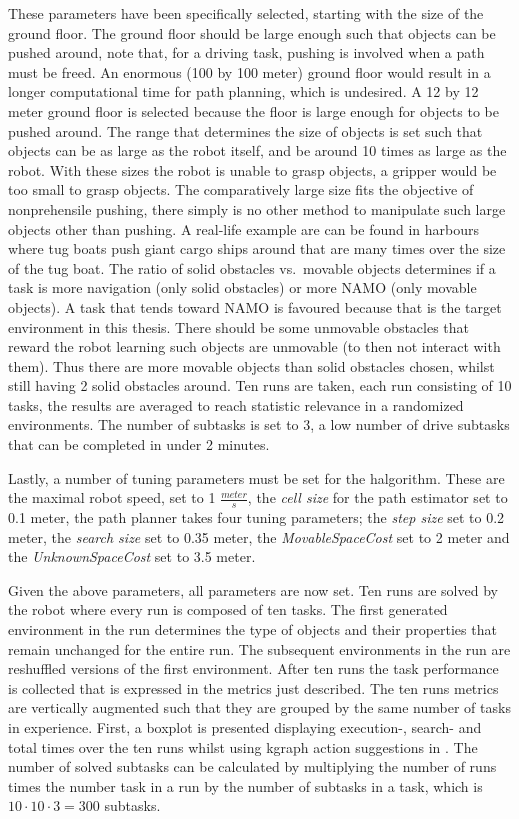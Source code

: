 These parameters have been specifically selected, starting with the size of the ground floor. The ground floor should be large enough such that objects can be pushed around, note that, for a driving task, pushing is involved when a path must be freed. An enormous (100 by 100 meter) ground floor would result in a longer computational time for path planning, which is undesired. A 12 by 12 meter ground floor is selected because the floor is large enough for objects to be pushed around. The range that determines the size of objects is set such that objects can be as large as the robot itself, and be around 10 times as large as the robot. With these sizes the robot is unable to grasp objects, a gripper would be too small to grasp objects. The comparatively large size fits the objective of nonprehensile pushing, there simply is no other method to manipulate such large objects other than pushing. A real-life example are can be found in harbours where tug boats push giant cargo ships around that are many times over the size of the tug boat. The ratio of solid obstacles vs.~movable objects determines if a task is more navigation (only solid obstacles) or more \ac{NAMO} (only movable objects). A task that tends toward \ac{NAMO} is favoured because that is the target environment in this thesis. There should be some unmovable obstacles that reward the robot learning such objects are unmovable (to then not interact with them). Thus there are more movable objects than solid obstacles chosen, whilst still having 2 solid obstacles around. Ten runs are taken, each run consisting of 10 tasks, the results are averaged to reach statistic relevance in a randomized environments. The number of subtasks is set to 3, a low number of drive subtasks that can be completed in under 2 minutes.\bs

Lastly, a number of tuning parameters must be set for the \ac{halgorithm}. These are the maximal robot speed, set to 1 $\frac{\mathit{meter}}{\mathit{s}}$, the \textit{cell size} for the path estimator set to 0.1 meter, the path planner takes four tuning parameters; the \textit{step size} set to 0.2 meter, the \textit{search size} set to 0.35 meter, the \textit{MovableSpaceCost} set to 2 meter and the \textit{UnknownSpaceCost} set to 3.5 meter.\bs

Given the above parameters, all parameters are now set. Ten runs are solved by the robot where every run is composed of ten tasks. The first generated environment in the run determines the type of objects and their properties that remain unchanged for the entire run. The subsequent environments in the run are reshuffled versions of the first environment. After ten runs the task performance is collected that is expressed in the metrics just described. The ten runs metrics are vertically augmented such that they are grouped by the same number of tasks in experience. First, a boxplot is presented displaying execution-, search- and total times over the ten runs whilst using \ac{kgraph} action suggestions in . The number of solved subtasks can be calculated by multiplying the number of runs times the number task in a run by the number of subtasks in a task, which is $10 \cdot 10 \cdot 3 = 300$ subtasks.\bs

